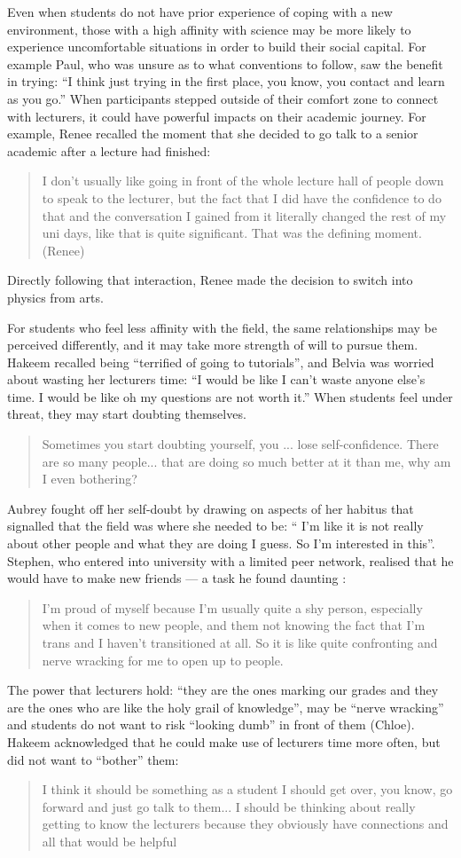 Even when students do not have prior experience of coping with a new environment, those with a high affinity with science may be more likely to experience uncomfortable situations in order to build their social capital. For example Paul, who was unsure as to what conventions to follow, saw the benefit in trying: ``I think just trying in the first place, you know, you contact and learn as you go.'' When participants stepped outside of their comfort zone to connect with lecturers, it could have powerful impacts on their academic journey. For example, Renee recalled the moment that she decided to go talk to a senior academic after a lecture had finished: \blockquote{I don't usually like going in front of the whole lecture hall of people down to speak to the lecturer, but the fact that I did have the confidence to do that and the conversation I gained from it literally changed the rest of my uni days, like that is quite significant. That was the defining moment. (Renee)}  Directly following that interaction, Renee made the decision to switch into physics from arts.


For students who feel less affinity with the field, the same relationships may be perceived differently, and it may take more strength of will to pursue them. Hakeem recalled being ``terrified of going to tutorials'', and Belvia was worried about wasting her lecturers time: ``I would be like I can’t waste anyone else’s time. I would be like oh my questions are not worth it.'' When students feel under threat, they may start doubting themselves. \blockquote{Sometimes you start doubting yourself, you ... lose self-confidence. There are so many people... that are doing so much better at it than me, why am I even bothering?} Aubrey fought off her self-doubt by drawing on aspects of her habitus that signalled that the field was where she needed to be: `` I'm like it is not really about other people and what they are doing I guess. So I’m interested in this''. Stephen, who entered into university with a limited peer network, realised that he would have to make new friends --- a task he found daunting : \blockquote{I’m proud of myself because I’m usually quite a shy person, especially when it comes to new people, and them not knowing the fact that I'm trans and I haven't transitioned at all. So it is like quite confronting and nerve wracking for me to open up to people.}

The power that lecturers hold: ``they are the ones marking our grades and they are the ones who are like the holy grail of knowledge'', may be ``nerve wracking'' and students do not want to risk ``looking dumb'' in front of them (Chloe). Hakeem acknowledged that he could make use of lecturers time more often, but did not want to ``bother''  them: \blockquote{I think it should be something as a student I should get over, you know, go forward and just go talk to them... I should be thinking about really getting to know the lecturers because they obviously have connections and all that would be helpful}. 




